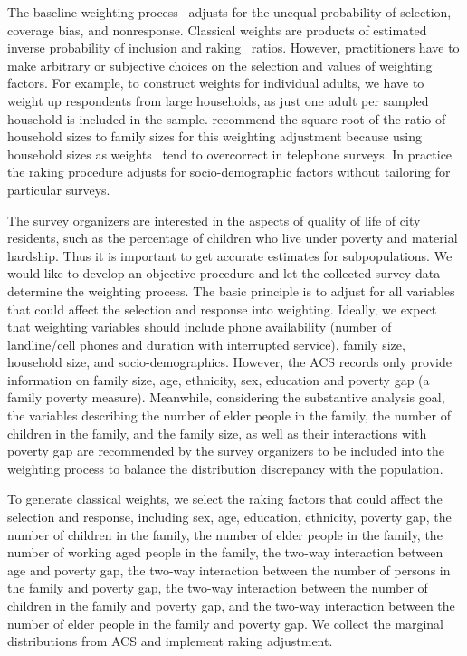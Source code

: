 \documentclass[11pt]{article}
\begin{document}
The baseline weighting process~\citep{RHweighting} adjusts for the unequal probability of selection, coverage bias, and nonresponse. Classical weights are products of estimated inverse probability of inclusion and raking~\citep{gr-rake93} ratios. However, practitioners have to make arbitrary or subjective choices on the selection and values of weighting factors. For example, to construct weights for individual adults, we have to weight up respondents from large households, as just one adult per sampled household is included in the sample. \cite{gelman:little:98} recommend the square root of the ratio of household sizes to family sizes for this weighting adjustment because using household sizes as weights~\cite[for example,][]{acsweighting2014} tend to overcorrect in telephone surveys. In practice the raking procedure adjusts for socio-demographic factors without tailoring for particular surveys.
	
The survey organizers are interested in the aspects of quality of life of city residents, such as the percentage of children who live under poverty and material hardship. Thus it is important to get accurate estimates for subpopulations. We would like to develop an objective procedure and let the collected survey data determine the weighting process. The basic principle is to adjust for all variables that could affect the selection and response into weighting. Ideally, we expect that weighting variables should include phone availability (number of landline/cell phones and duration with interrupted service), family size, household size, and socio-demographics. However, the ACS records only provide information on family size, age, ethnicity, sex, education and poverty gap (a family poverty measure). Meanwhile, considering the substantive analysis goal, the variables describing the number of elder people in the family, the number of children in the family, and the family size, as well as their interactions with poverty gap are recommended by the survey organizers to be included into the weighting process to balance the distribution discrepancy with the population. 
	
To generate classical weights, we select the raking factors that could affect the selection and response, including sex, age, education, ethnicity, poverty gap, the number of children in the family, the number of elder people in the family, the number of working aged people in the family, the two-way interaction between age and poverty gap, the two-way interaction between the number of persons in the family and poverty gap, the two-way interaction between the number of children in the family and poverty gap, and the two-way interaction between the number of elder people in the family and poverty gap. We collect the marginal distributions from ACS and implement raking adjustment. 
		
\end{document}
